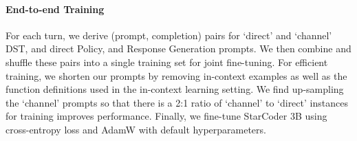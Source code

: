 \documentclass[11pt]{article}
\newcommand{\bdk}[1]{}
\begin{document}
\paragraph{End-to-end Training} 
For each turn, we derive (prompt, completion) pairs for `direct' and `channel' DST, 
and direct Policy, and Response Generation prompts.
We then combine and shuffle these pairs into a single training set for joint fine-tuning.
For efficient training, we shorten our prompts by removing in-context examples as well as the function definitions used in the in-context learning setting. 
We find up-sampling the `channel' prompts so that there is a 2:1 ratio of `channel' to `direct' instances for training improves performance. 
Finally, we fine-tune StarCoder 3B using cross-entropy loss and AdamW with default hyperparameters. 
\end{document}
